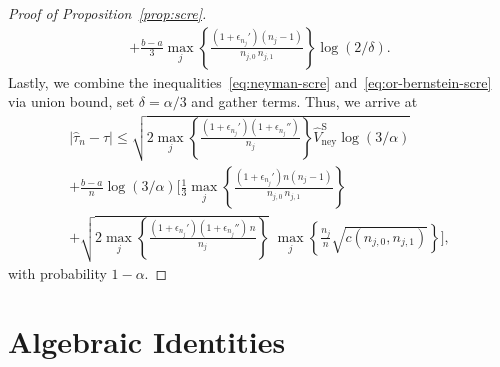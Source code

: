 \documentclass[aos]{imsart2}
\theoremstyle{plain}
\theoremstyle{definition}
\newcommand{\vhn}{\hat{V}_{\mathrm{ney}}}
\newcommand{\vhns}{\vhn^\mathrm{S}}
\newcommand{\tauh}{\hat{\tau}}
\begin{document}
\begin{appendix}
\begin{proof}[Proof of Proposition~\ref{prop:scre}]
\begin{multline}
        + \frac{b-a}{3} \max_j \left\{\frac{(1+\epsilon_{n_j}')(n_j-1)}{n_{j,0}\,n_{j,1}}\right\} \log(2/\delta).
    \end{multline}
    Lastly, we combine the inequalities~\eqref{eq:neyman-scre} and~\eqref{eq:or-bernstein-scre} via union bound, set $\delta = \alpha/3$ and gather terms. Thus, we arrive at
    \begin{multline*}
        \lvert \tauh_n-\tau \rvert \leq \sqrt{2 \max_j\left\{\frac{(1+\epsilon_{n_j}')(1+\epsilon_{n_j}'')}{n_j}\right\} \vhns \log(3/\alpha)}\\
        +\frac{b-a}{n}\log(3/\alpha) \Bigg[\frac{1}{3} \max_j \left\{\frac{(1+\epsilon_{n_j}')n(n_j-1)}{n_{j,0}\,n_{j,1}}\right\}\\
        + \sqrt{2\max_j\left\{\frac{(1+\epsilon_{n_j}')(1+\epsilon_{n_j}'')\,n}{n_j}\right\}} \,\,\max_{j} \left\{\frac{n_j}{n}\sqrt{c(n_{j,0},n_{j,1})}\right\}\Bigg],
    \end{multline*}
    with probability $1-\alpha$.    
\end{proof}

\section{Algebraic Identities}\label{app:lin-alg}


\end{appendix}
\end{document}
